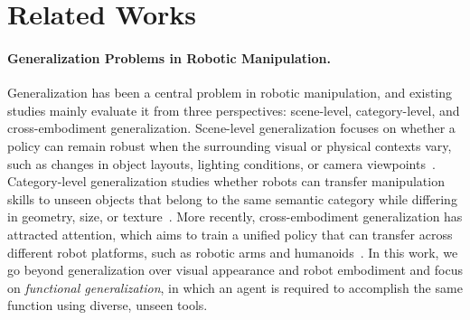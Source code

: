 \section{Related Works}
\label{sec:related_works}

\paragraph{Generalization Problems in Robotic Manipulation.}
Generalization has been a central problem in robotic manipulation, and existing studies mainly evaluate it from three perspectives: scene-level, category-level, and cross-embodiment generalization.
Scene-level generalization focuses on whether a policy can remain robust when the surrounding visual or physical contexts vary, such as changes in object layouts, lighting conditions, or camera viewpoints~\citep{goyal2023rvt, shridhar2023perceiver, shridhar2022cliport, nair2023r3m}. 
Category-level generalization studies whether robots can transfer manipulation skills to unseen objects that belong to the same semantic category while differing in geometry, size, or texture~\citep{gao2021kpam, mo2021where2act, geng2023gapartnet}.
More recently, cross-embodiment generalization has attracted attention, which aims to train a unified policy that can transfer across different robot platforms, such as robotic arms and humanoids~\citep{o2024open, team2024octo, intelligence2025pi}.
In this work, we go beyond generalization over visual appearance and robot embodiment and focus on \textit{functional generalization}, in which an agent is required to accomplish the same function using diverse, unseen tools.



